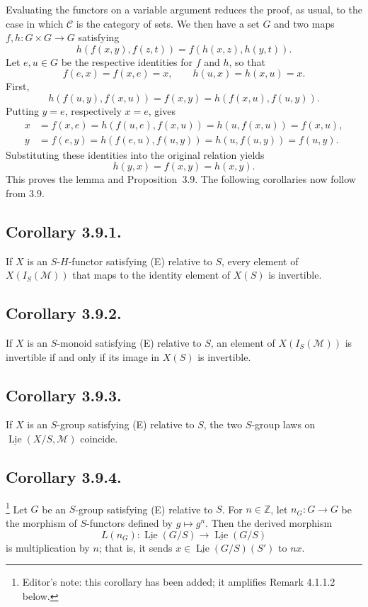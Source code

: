 Evaluating the functors on a variable argument reduces the proof, as
usual, to the case in which \(\mathscr C\) is the category of sets. We
then have a set \(G\) and two maps \(f,h:G\times G\to G\) satisfying
\[
  h(f(x,y),f(z,t))=f(h(x,z),h(y,t)).
\]
Let \(e,u\in G\) be the respective identities for \(f\) and \(h\), so
that
\[
  f(e,x)=f(x,e)=x,
  \qquad h(u,x)=h(x,u)=x.
\]
First,
\[
  h(f(u,y),f(x,u))=f(x,y)=h(f(x,u),f(u,y)).
\]
Putting \(y=e\), respectively \(x=e\), gives
\begin{align*}
  x&=f(x,e)=h(f(u,e),f(x,u))=h(u,f(x,u))=f(x,u),\\
  y&=f(e,y)=h(f(e,u),f(u,y))=h(u,f(u,y))=f(u,y).
\end{align*}
Substituting these identities into the original relation yields
\[
  h(y,x)=f(x,y)=h(x,y).
\]
This proves the lemma and Proposition~3.9. The following corollaries now
follow from 3.9.

\subsection*{Corollary 3.9.1.}
If \(X\) is an \(S\)-\(H\)-functor satisfying (E) relative to \(S\),
every element of \(X(I_S(\mathcal M))\) that maps to the identity element
of \(X(S)\) is invertible.

\subsection*{Corollary 3.9.2.}
If \(X\) is an \(S\)-monoid satisfying (E) relative to \(S\), an element
of \(X(I_S(\mathcal M))\) is invertible if and only if its image in
\(X(S)\) is invertible.

\subsection*{Corollary 3.9.3.}
If \(X\) is an \(S\)-group satisfying (E) relative to \(S\), the two
\(S\)-group laws on
\(\underline{\operatorname{Lie}}(X/S,\mathcal M)\) coincide.

\subsection*{Corollary 3.9.4.}
\footnote{Editor's note: this corollary has been added; it amplifies
Remark 4.1.1.2 below.}
Let \(G\) be an \(S\)-group satisfying (E) relative to \(S\). For
\(n\in\mathbb Z\), let \(n_G:G\to G\) be the morphism of \(S\)-functors
defined by \(g\mapsto g^n\). Then the derived morphism
\[
  L(n_G):\underline{\operatorname{Lie}}(G/S)\longrightarrow
  \underline{\operatorname{Lie}}(G/S)
\]
is multiplication by \(n\); that is, it sends
\(x\in\underline{\operatorname{Lie}}(G/S)(S')\) to \(nx\).

